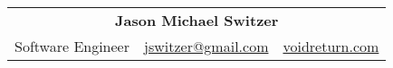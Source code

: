 \documentclass{scrartcl}
\begin{document}
\setlength{\parindent}{0pt}
\setlength{\parskip}{\baselineskip}
\setlength{\parsep}{0in}
\pagestyle{empty}

\newcommand{\expert}[1]{\mdseries\itshape{#1}}
\newcommand{\citembullet}{$\diamond$}

\begin{center}
\begin{tabular}{c|c|c}
\multicolumn{3}{c}{{\sc\bfseries\Huge Jason Michael Switzer}}\tabularnewline
Software Engineer & \href{mailto:jswitzer@gmail.com}{jswitzer@gmail.com} & \href{http://www.voidreturn.com}{voidreturn.com}\tabularnewline
\end{tabular}
\end{center}

%
\fontsize{11}{12}\selectfont
\par \
\end{document}
